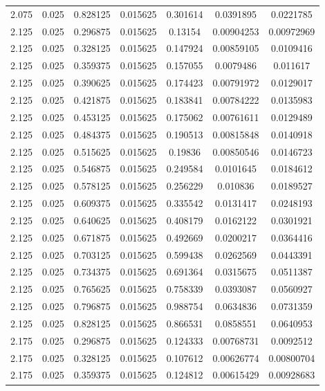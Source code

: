 \begin{table}[bh]
\begin{center}
{\begin{tabular}{ccccccc}
2.075	 & 0.025 & 	0.828125	 & 0.015625	 & 0.301614	 & 0.0391895	 & 0.0221785 \\ 
2.125	 & 0.025 & 	0.296875	 & 0.015625	 & 0.13154	 & 0.00904253	 & 0.00972969 \\ 
2.125	 & 0.025 & 	0.328125	 & 0.015625	 & 0.147924	 & 0.00859105	 & 0.0109416 \\ 
2.125	 & 0.025 & 	0.359375	 & 0.015625	 & 0.157055	 & 0.0079486	 & 0.011617 \\ 
2.125	 & 0.025 & 	0.390625	 & 0.015625	 & 0.174423	 & 0.00791972	 & 0.0129017 \\ 
2.125	 & 0.025 & 	0.421875	 & 0.015625	 & 0.183841	 & 0.00784222	 & 0.0135983 \\ 
2.125	 & 0.025 & 	0.453125	 & 0.015625	 & 0.175062	 & 0.00761611	 & 0.0129489 \\ 
2.125	 & 0.025 & 	0.484375	 & 0.015625	 & 0.190513	 & 0.00815848	 & 0.0140918 \\ 
2.125	 & 0.025 & 	0.515625	 & 0.015625	 & 0.19836	 & 0.00850546	 & 0.0146723 \\ 
2.125	 & 0.025 & 	0.546875	 & 0.015625	 & 0.249584	 & 0.0101645	 & 0.0184612 \\ 
2.125	 & 0.025 & 	0.578125	 & 0.015625	 & 0.256229	 & 0.010836	 & 0.0189527 \\ 
2.125	 & 0.025 & 	0.609375	 & 0.015625	 & 0.335542	 & 0.0131417	 & 0.0248193 \\ 
2.125	 & 0.025 & 	0.640625	 & 0.015625	 & 0.408179	 & 0.0162122	 & 0.0301921 \\ 
2.125	 & 0.025 & 	0.671875	 & 0.015625	 & 0.492669	 & 0.0200217	 & 0.0364416 \\ 
2.125	 & 0.025 & 	0.703125	 & 0.015625	 & 0.599438	 & 0.0262569	 & 0.0443391 \\ 
2.125	 & 0.025 & 	0.734375	 & 0.015625	 & 0.691364	 & 0.0315675	 & 0.0511387 \\ 
2.125	 & 0.025 & 	0.765625	 & 0.015625	 & 0.758339	 & 0.0393087	 & 0.0560927 \\ 
2.125	 & 0.025 & 	0.796875	 & 0.015625	 & 0.988754	 & 0.0634836	 & 0.0731359 \\ 
2.125	 & 0.025 & 	0.828125	 & 0.015625	 & 0.866531	 & 0.0858551	 & 0.0640953 \\ 
2.175	 & 0.025 & 	0.296875	 & 0.015625	 & 0.124333	 & 0.00768731	 & 0.0092512 \\ 
2.175	 & 0.025 & 	0.328125	 & 0.015625	 & 0.107612	 & 0.00626774	 & 0.00800704 \\ 
2.175	 & 0.025 & 	0.359375	 & 0.015625	 & 0.124812	 & 0.00615429	 & 0.00928683 \\ 

\end{tabular}}
\end{center}
\end{table}
